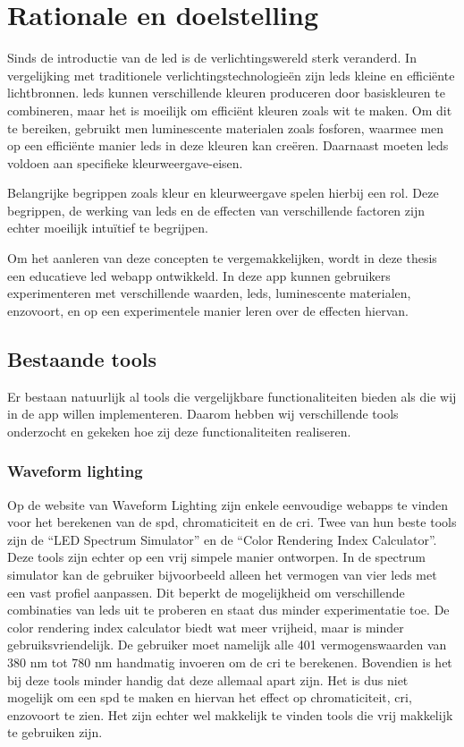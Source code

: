 \chapter{Rationale en doelstelling}\label{ch:introduction}

Sinds de introductie van de \gls{led} is de verlichtingswereld sterk veranderd. In vergelijking met traditionele verlichtingstechnologie\"en zijn \gls{led}s kleine en effici\"ente lichtbronnen. \gls{led}s kunnen verschillende kleuren produceren door basiskleuren te combineren, maar het is moeilijk om effici\"ent kleuren zoals wit te maken. Om dit te bereiken, gebruikt men luminescente materialen zoals fosforen, waarmee men op een effici\"ente manier \gls{led}s in deze kleuren kan cre\"eren. Daarnaast moeten \gls{led}s voldoen aan specifieke kleurweergave-eisen.

Belangrijke begrippen zoals kleur en kleurweergave spelen hierbij een rol. Deze begrippen, de werking van \gls{led}s en de effecten van verschillende factoren zijn echter moeilijk intu\"itief te begrijpen.

Om het aanleren van deze concepten te vergemakkelijken, wordt in deze thesis een educatieve \gls{led} webapp ontwikkeld. In deze app kunnen gebruikers experimenteren met verschillende waarden, \gls{led}s, luminescente materialen, enzovoort, en op een experimentele manier leren over de effecten hiervan.

\section{Bestaande tools}

Er bestaan natuurlijk al tools die vergelijkbare functionaliteiten bieden als die wij in de app willen implementeren. Daarom hebben wij verschillende tools onderzocht en gekeken hoe zij deze functionaliteiten realiseren.

\subsection{Waveform lighting}

Op de website van Waveform Lighting zijn enkele eenvoudige webapps te vinden voor het berekenen van de \gls{spd}, chromaticiteit en de \gls{cri}. Twee van hun beste tools zijn de ``LED Spectrum Simulator'' en de ``Color Rendering Index Calculator''. Deze tools zijn echter op een vrij simpele manier ontworpen. In de spectrum simulator kan de gebruiker bijvoorbeeld alleen het vermogen van vier \gls{led}s met een vast profiel aanpassen. Dit beperkt de mogelijkheid om verschillende combinaties van \gls{led}s uit te proberen en staat dus minder experimentatie toe. De color rendering index calculator biedt wat meer vrijheid, maar is minder gebruiksvriendelijk. De gebruiker moet namelijk alle 401 vermogenswaarden van 380 \gls{nm} tot 780 \gls{nm} handmatig invoeren om de \gls{cri} te berekenen. Bovendien is het bij deze tools minder handig dat deze allemaal apart zijn. Het is dus niet mogelijk om een \gls{spd} te maken en hiervan het effect op chromaticiteit, \gls{cri}, enzovoort te zien. Het zijn echter wel makkelijk te vinden tools die vrij makkelijk te gebruiken zijn. 

